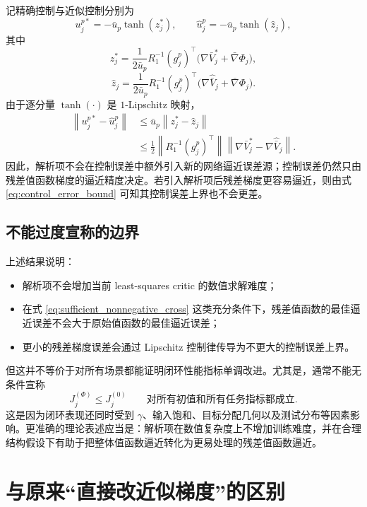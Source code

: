 \documentclass[11pt,a4paper]{article}
\newcommand{\ubar}{\bar{u}}
\newcommand{\norm}[1]{\left\lVert #1 \right\rVert}
\begin{document}
记精确控制与近似控制分别为
\begin{equation}
u_j^{p*}=-\ubar_p\tanh(z_j^*),
\qquad
\hat u_j^p=-\ubar_p\tanh(\hat z_j),
\end{equation}
其中
\begin{equation}
z_j^*=
\frac{1}{2\ubar_p}
R_1^{-1}(g_j^p)^\top
\big(\nabla\bar V_j^*+\bar\nabla\Phi_j\big),
\end{equation}
\begin{equation}
\hat z_j=
\frac{1}{2\ubar_p}
R_1^{-1}(g_j^p)^\top
\big(\nabla\hat{\bar V}_j+\bar\nabla\Phi_j\big).
\end{equation}
由于逐分量 $\tanh(\cdot)$ 是 $1$-Lipschitz 映射，
\begin{align}
\norm{u_j^{p*}-\hat u_j^p}
&\le
\ubar_p \norm{z_j^*-\hat z_j}\\
&\le
\frac{1}{2}
\norm{R_1^{-1}(g_j^p)^\top}
\norm{\nabla\bar V_j^*-\nabla\hat{\bar V}_j}.
\label{eq:control_error_bound}
\end{align}
因此，解析项不会在控制误差中额外引入新的网络逼近误差源；控制误差仍然只由残差值函数梯度的逼近精度决定。若引入解析项后残差梯度更容易逼近，则由式 \eqref{eq:control_error_bound} 可知其控制误差上界也不会更差。

\subsection{不能过度宣称的边界}

上述结果说明：
\begin{itemize}
\item 解析项不会增加当前 least-squares critic 的数值求解难度；
\item 在式 \eqref{eq:sufficient_nonnegative_cross} 这类充分条件下，残差值函数的最佳逼近误差不会大于原始值函数的最佳逼近误差；
\item 更小的残差梯度误差会通过 Lipschitz 控制律传导为不更大的控制误差上界。
\end{itemize}
但这并不等价于对所有场景都能证明闭环性能指标单调改进。尤其是，通常不能无条件宣称
\begin{equation}
J_j^{(\Phi)}\le J_j^{(0)}
\qquad
\text{对所有初值和所有任务指标都成立}.
\end{equation}
这是因为闭环表现还同时受到 $\gamma$、输入饱和、目标分配几何以及测试分布等因素影响。更准确的理论表述应当是：解析项在数值复杂度上不增加训练难度，并在合理结构假设下有助于把整体值函数逼近转化为更易处理的残差值函数逼近。

\section{与原来“直接改近似梯度”的区别}
\end{document}

